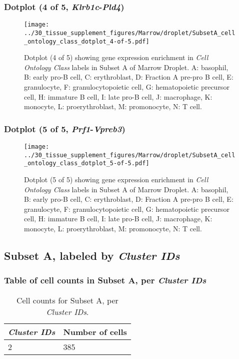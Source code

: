 \clearpage

\subsubsection{Dotplot (4 of 5, \emph{Klrb1c}-\emph{Pld4})}
\begin{figure}[h]
\centering
\texttt{[image: ../30\_tissue\_supplement\_figures/Marrow/droplet/SubsetA\_cell\_ontology\_class\_dotplot\_4-of-5.pdf]}

\caption{ Dotplot (4 of 5)  showing gene expression enrichment in \emph{Cell Ontology Class} labels in Subset A of Marrow Droplet. A: basophil, B: early pro-B cell, C: erythroblast, D: Fraction A pre-pro B cell, E: granulocyte, F: granulocytopoietic cell, G: hematopoietic precursor cell, H: immature B cell, I: late pro-B cell, J: macrophage, K: monocyte, L: proerythroblast, M: promonocyte, N: T cell.}
\end{figure}


\clearpage

\subsubsection{Dotplot (5 of 5, \emph{Prf1}-\emph{Vpreb3})}
\begin{figure}[h]
\centering
\texttt{[image: ../30\_tissue\_supplement\_figures/Marrow/droplet/SubsetA\_cell\_ontology\_class\_dotplot\_5-of-5.pdf]}

\caption{ Dotplot (5 of 5)  showing gene expression enrichment in \emph{Cell Ontology Class} labels in Subset A of Marrow Droplet. A: basophil, B: early pro-B cell, C: erythroblast, D: Fraction A pre-pro B cell, E: granulocyte, F: granulocytopoietic cell, G: hematopoietic precursor cell, H: immature B cell, I: late pro-B cell, J: macrophage, K: monocyte, L: proerythroblast, M: promonocyte, N: T cell.}
\end{figure}


\clearpage

\subsection{Subset A, labeled by \emph{Cluster IDs}}
\subsubsection{Table of cell counts in Subset A, per \emph{Cluster IDs}}\begin{table}[h]
\centering
\label{my-label}
\begin{tabular}{@{}ll@{}}
\toprule

\emph{Cluster IDs}& Number of cells \\ \midrule
2 & 385 \\
\bottomrule
\end{tabular}
\caption{Cell counts for Subset A, per \emph{Cluster IDs}.}
\end{table}

